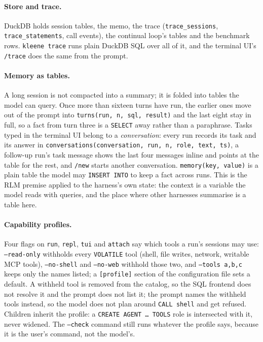 \documentclass[11pt,a4paper]{article}
\newcommand{\code}[1]{\texttt{#1}}
\begin{document}
\paragraph{Store and trace.} DuckDB holds session tables, the memo, the trace
(\code{trace\_sessions}, \code{trace\_statements}, call events), the continual
loop's tables and the benchmark rows. \code{kleene trace} runs plain DuckDB SQL
over all of it, and the terminal UI's \code{/trace} does the same from the
prompt.

\paragraph{Memory as tables.} A long session is not compacted into a
summary; it is folded into tables the model can query. Once more than
sixteen turns have run, the earlier ones move out of the prompt into
\code{turns(run, n, sql, result)} and the last eight stay in full, so a
fact from turn three is a \code{SELECT} away rather than a paraphrase.
Tasks typed in the terminal UI belong to a \emph{conversation}: every run
records its task and its answer in \code{conversations(conversation, run,
n, role, text, ts)}, a follow-up run's task message shows the last four
messages inline and points at the table for the rest, and \code{/new}
starts another conversation. \code{memory(key, value)} is a plain table
the model may \code{INSERT INTO} to keep a fact across runs. This is the
RLM premise applied to the harness's own state: the context is a variable
the model reads with queries, and the place where other harnesses
summarise is a table here.

\paragraph{Capability profiles.} Four flags on \code{run}, \code{repl},
\code{tui} and \code{attach} say which tools a run's sessions may use:
\code{--read-only} withholds every \code{VOLATILE} tool (shell, file
writes, network, writable MCP tools), \code{--no-shell} and
\code{--no-web} withhold those two, and \code{--tools a,b,c} keeps only the
names listed; a \code{[profile]} section of the configuration file sets a
default. A withheld tool is removed from the catalog, so the SQL frontend
does not resolve it and the prompt does not list it; the prompt names the
withheld tools instead, so the model does not plan around \code{CALL
shell} and get refused. Children inherit the profile: a \code{CREATE AGENT
\ldots{} TOOLS} role is intersected with it, never widened. The
\code{--check} command still runs whatever the profile says, because it is
the user's command, not the model's.
\end{document}
